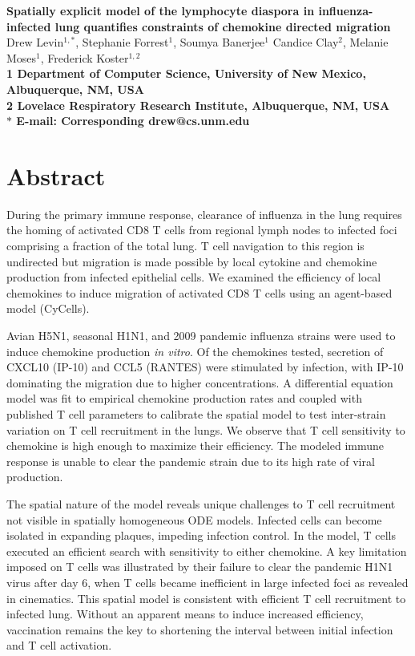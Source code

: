 \documentclass[10pt]{article}
\date{}
\begin{document}
\begin{flushleft}
{\Large
\textbf{Spatially explicit model of the lymphocyte diaspora in influenza-infected lung quantifies constraints of chemokine directed migration}
}
\\
Drew Levin$^{1,\ast}$, 
Stephanie Forrest$^{1}$, 
Soumya Banerjee$^{1}$
Candice Clay$^{2}$, 
Melanie Moses$^{1}$, 
Frederick Koster$^{1,2}$
\\
\bf{1} Department of Computer Science, University of New Mexico, Albuquerque, NM, USA
\\
\bf{2} Lovelace Respiratory Research Institute, Albuquerque, NM, USA
\\
$\ast$ E-mail: Corresponding drew@cs.unm.edu
\end{flushleft}



\section*{Abstract}

During the primary immune response, clearance of influenza in the lung requires the homing of activated CD8 T cells from regional lymph nodes to infected foci comprising a fraction of the total lung.  T cell navigation to this region is undirected but migration is made possible by local cytokine and chemokine production from infected epithelial cells.  We examined the efficiency of local chemokines to induce migration of activated CD8 T cells using an agent-based model (CyCells).  

Avian H5N1, seasonal H1N1, and 2009 pandemic influenza strains were used to induce chemokine production \textit{in vitro}.  Of the chemokines tested, secretion of CXCL10 (IP-10) and CCL5 (RANTES) were stimulated by infection, with IP-10 dominating the migration due to higher concentrations.  A differential equation model was fit to empirical chemokine production rates and coupled with published T cell parameters to calibrate the spatial model to test inter-strain variation on T cell recruitment in the lungs.  We observe that T cell sensitivity to chemokine is high enough to maximize their efficiency.  The modeled immune response is unable to clear the pandemic strain due to its high rate of viral production.  

The spatial nature of the model reveals unique challenges to T cell recruitment not visible in spatially homogeneous ODE models.  Infected cells can become isolated in expanding plaques, impeding infection control.  In the model, T cells executed an efficient search with sensitivity to either chemokine.  A key limitation imposed on T cells was illustrated by their failure to clear the pandemic H1N1 virus after day 6, when T cells became inefficient in large infected foci as revealed in cinematics. This spatial model is consistent with efficient T cell recruitment to infected lung.  Without an apparent means to induce increased efficiency, vaccination remains the key to shortening the interval between initial infection and T cell activation.
\end{document}
